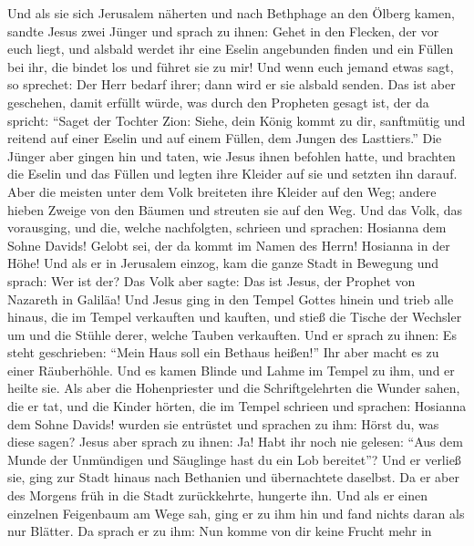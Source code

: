  Und als sie sich Jerusalem näherten und nach Bethphage an
den Ölberg kamen, sandte Jesus zwei Jünger  und sprach zu
ihnen: Gehet in den Flecken, der vor euch liegt, und alsbald werdet ihr
eine Eselin angebunden finden und ein Füllen bei ihr, die bindet los und
führet sie zu mir!  Und wenn euch jemand etwas sagt, so
sprechet: Der Herr bedarf ihrer; dann wird er sie alsbald senden.
 Das ist aber geschehen, damit erfüllt würde, was durch
den Propheten gesagt ist, der da spricht:  ``Saget der
Tochter Zion: Siehe, dein König kommt zu dir, sanftmütig und reitend auf
einer Eselin und auf einem Füllen, dem Jungen des Lasttiers.''
 Die Jünger aber gingen hin und taten, wie Jesus ihnen
befohlen hatte,  und brachten die Eselin und das Füllen
und legten ihre Kleider auf sie und setzten ihn darauf. 
Aber die meisten unter dem Volk breiteten ihre Kleider auf den Weg;
andere hieben Zweige von den Bäumen und streuten sie auf den Weg.
 Und das Volk, das vorausging, und die, welche
nachfolgten, schrieen und sprachen: Hosianna dem Sohne Davids! Gelobt
sei, der da kommt im Namen des Herrn! Hosianna in der Höhe!
 Und als er in Jerusalem einzog, kam die ganze Stadt in
Bewegung und sprach: Wer ist der?  Das Volk aber sagte:
Das ist Jesus, der Prophet von Nazareth in Galiläa!  Und
Jesus ging in den Tempel Gottes hinein und trieb alle hinaus, die im
Tempel verkauften und kauften, und stieß die Tische der Wechsler um und
die Stühle derer, welche Tauben verkauften.  Und er
sprach zu ihnen: Es steht geschrieben: ``Mein Haus soll ein Bethaus
heißen!'' Ihr aber macht es zu einer Räuberhöhle.  Und es
kamen Blinde und Lahme im Tempel zu ihm, und er heilte sie.
 Als aber die Hohenpriester und die Schriftgelehrten die
Wunder sahen, die er tat, und die Kinder hörten, die im Tempel schrieen
und sprachen: Hosianna dem Sohne Davids! wurden sie entrüstet
 und sprachen zu ihm: Hörst du, was diese sagen? Jesus
aber sprach zu ihnen: Ja! Habt ihr noch nie gelesen: ``Aus dem Munde der
Unmündigen und Säuglinge hast du ein Lob bereitet''?  Und
er verließ sie, ging zur Stadt hinaus nach Bethanien und übernachtete
daselbst.  Da er aber des Morgens früh in die Stadt
zurückkehrte, hungerte ihn.  Und als er einen einzelnen
Feigenbaum am Wege sah, ging er zu ihm hin und fand nichts daran als nur
Blätter. Da sprach er zu ihm: Nun komme von dir keine Frucht mehr in
